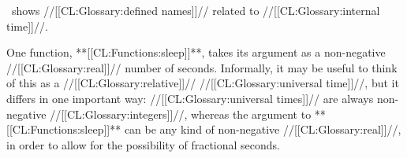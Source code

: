 \Thenextfigure\ shows //[[CL:Glossary:defined names]]// related to //[[CL:Glossary:internal time]]//.


\endsubsubsection%


One function, **[[CL:Functions:sleep]]**, takes its argument as a non-negative //[[CL:Glossary:real]]// number
of seconds.  Informally, it may be useful to think of this as 
a //[[CL:Glossary:relative]]// //[[CL:Glossary:universal time]]//, but it differs in one important way:
//[[CL:Glossary:universal times]]// are always non-negative //[[CL:Glossary:integers]]//, whereas the argument to
**[[CL:Functions:sleep]]** can be any kind of non-negative //[[CL:Glossary:real]]//, in order to allow for
the possibility of fractional seconds.


\endsubsubsection%

\endsubsection%

